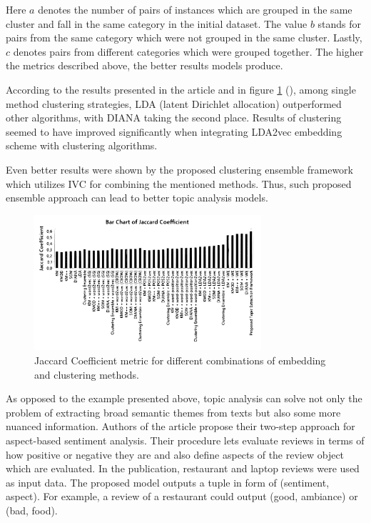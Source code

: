 \documentclass[3p,times,procedia]{elsarticle}
\begin{document}
Here $a$ denotes the number of pairs of instances which are grouped in the same cluster and fall in the same category in the initial dataset. The value $b$ stands for pairs from the same category which were not grouped in the same cluster. Lastly, $c$ denotes pairs from different categories which were grouped together. The higher the metrics described above, the better results models produce.

According to the results presented in the article and in figure \ref{fig:gr1} (\cite{onan2019two}), among single method clustering strategies, LDA (latent Dirichlet allocation) outperformed other algorithms, with DIANA taking the second place. Results of clustering seemed to have improved significantly when integrating LDA2vec embedding scheme with clustering algorithms.

Even better results were shown by the proposed clustering ensemble framework which utilizes IVC for combining the mentioned methods. Thus, such proposed ensemble approach can lead to better topic analysis models.

\begin{figure}[!h]\vspace*{4pt}
	\centerline{\includegraphics[width=0.75\textwidth]{./visuals/gr1.pdf}}
\caption{Jaccard Coefficient metric for different combinations of embedding and clustering methods.}
\label{fig:gr1}
\end{figure}

As opposed to the example presented above, topic analysis can solve not only the problem of extracting broad semantic themes from texts but also some more nuanced information. Authors of the article \cite{huang2020weakly} propose their two-step approach for aspect-based sentiment analysis. Their procedure lets evaluate reviews in terms of how positive or negative they are and also define aspects of the review object which are evaluated. In the publication, restaurant and laptop reviews were used as input data. The proposed model outputs a tuple in form of (sentiment, aspect). For example, a review of a restaurant could output (good, ambiance) or (bad, food).
\end{document}
